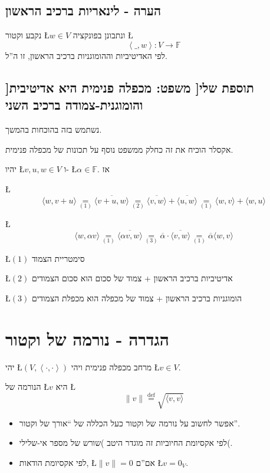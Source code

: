 \documentclass[english,hebrew]{article}
\begin{document}
\subsection{הערה - לינאריות ברכיב הראשון}

נקבע וקטור \L{$w\in V$} ונתבונן בפונקציה \L{%
\[
\left\langle \_,w\right\rangle :V\rightarrow\mathbb{F}
\]
}%
לפי האדיטיביות וההומוגניות ברכיב הראשון, זו ה\textquotedblright ל.

\subsection{{]}תוספת שלי{[} משפט: מכפלה פנימית היא אדיטיבית והומוגנית-צמודה ברכיב
השני}

נשתמש בזה בהוכחות בהמשך.

אקסלר הוכיח את זה כחלק ממשפט נוסף על תכונות של מכפלה פנימית.

יהיו \L{$v,u,w\in V$} ו- \L{$\alpha\in\mathbb{F}$}. אז

\L{%
\[
\langle w,v+u\rangle\underset{\left(1\right)}{=}\overline{\langle v+u,w\rangle}\underset{\left(2\right)}{=}\overline{\langle v,w\rangle}+\overline{\langle u,w\rangle}\underset{\left(1\right)}{=}\langle w,v\rangle+\langle w,u\rangle
\]
}%

\L{%
\[
\langle w,\alpha v\rangle\underset{\left(1\right)}{=}\overline{\langle\alpha v,w\rangle}\underset{\left(3\right)}{=}\overline{\alpha}\cdot\overline{\langle v,w\rangle}\underset{\left(1\right)}{=}\overline{\alpha}\langle w,v\rangle
\]
}%

\L{$\left(1\right)$} סימטריית הצמוד

\L{$(2)$} אדיטיביות ברכיב הראשון + צמוד של סכום הוא סכום הצמודים

\L{$(3)$} הומוגניות ברכיב הראשון + צמוד של מכפלה הוא מכפלת הצמודים

\section{הגדרה - נורמה של וקטור}

יהי \L{$(V,\left\langle \cdot,\cdot\right\rangle )$} מרחב מכפלה פנימית
ויהי \L{$v\in V$}.

הנורמה של \L{$v$} היא \L{%
\[
\|v\|\overset{\text{def}}{=}\sqrt{\langle v,v\rangle}
\]
}%

\begin{itemize}
\item אפשר לחשוב על נורמה של וקטור כעל הכללה של \textquotedblleft אורך של
וקטור\textquotedblright .
\item לפי אקסיומת החיוביות זה מוגדר היטב )שורש של מספר אי-שלילי(.
\item לפי אקסיומת הודאות, \L{$\|v\|=0$} אם\textquotedblright ם \L{$v=0_{V}$}.
\end{itemize}
\end{document}

